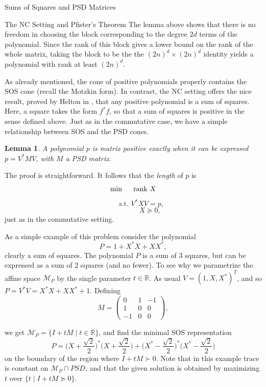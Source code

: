 \documentclass[12pt,oneside,final]{ucthesisucsbmath2010}
\newcommand{\R}{\mathbb{R}}
\newtheorem{lem}[thm]{Lemma}
\theoremstyle{definition}
\begin{document}
\begin{chapter}{Sums of Squares and PSD Matrices}
\begin{section}{The NC Setting and Pfister's Theorem}
The lemma above shows that there is no freedom in choosing the block corresponding to the degree $2d$ terms of the polynomial. Since the rank of this block gives a lower bound on the rank of the whole matrix, taking the block to be the the $(2n)^d\times (2n)^d$ identity yields a polynomial with rank at least $(2n)^d$.

As already mentioned, the cone of positive polynomials properly contains the SOS cone (recall the Motzkin form). In contrast, the NC setting offers the nice result, proved by Helton in \cite{HE}, that any positive polynomial is a sum of squares.  Here, a square takes the form $f^*f$, so that a sum of squares is positive in the sense defined above. Just as in the commutative case, we have a simple relationship between SOS and the PSD cones.

\begin{lem}
A polynomial $p$ is matrix positive exactly when it can be expressed $p=V^*MV$, with $M$ a PSD matrix.  
\end{lem}

The proof is straightforward.  It follows that the \emph{length} of $p$ is 
\[\min \hspace{.5cm}  \text{rank  }X\]
\[\hspace{1cm} \text{s.t.   } V^*XV=p,\]
\[\hspace{2cm} X \succeq 0,\] 
just as in the commutative setting.


As a simple example of this problem consider the polynomial \[P=1+X^*X+XX^*,\] clearly a sum of squares. The polynomial $P$ is a sum of $3$ squares, but can be expressed as a sum of $2$ squares (and no fewer).  To see why we parametrize the affine space $\mathcal M_P$ by the single parameter $t \in \R$.  As usual  $V=(1,X,X^*)^T$, and so $P=V^*V=X^*X+XX^*+1$. Defining 
\[M=\left(\begin{smallmatrix} 
 0 & 1 & -1\\
 1 & 0 &0\\
  -1 & 0& 0
\end{smallmatrix}\right),\]

we get $\mathcal M_P= \{I+tM \mid t\in \R\}$, and find the minimal SOS representation $$P=\Big(X+\frac{\sqrt{2}}{2}\Big)^*\Big(X+\frac{\sqrt{2}}{2}\Big) +\Big(X^*-\frac{\sqrt{2}}{2}\Big)^*\Big(X^*-\frac{\sqrt{2}}{2}\Big) $$
on the boundary of the region where $I+tM \succ 0$. Note that in this example trace is constant on $\mathcal M_P \cap PSD$, and that the given solution is obtained by maximizing $t$ over $\{t\mid I+tM \succeq 0\}$.


\end{section}
\end{chapter}
\end{document}
